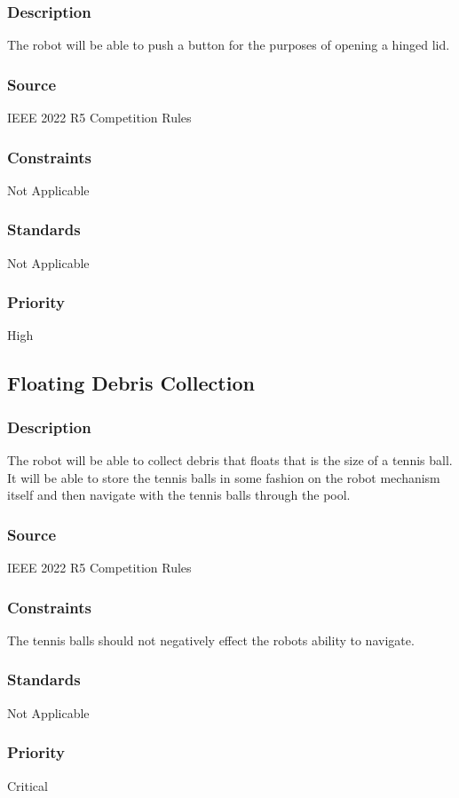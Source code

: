 \subsubsection{Description}
The robot will be able to push a button for the purposes of opening a hinged lid.
\subsubsection{Source}
IEEE 2022 R5 Competition Rules
\subsubsection{Constraints}
Not Applicable
\subsubsection{Standards}
Not Applicable
\subsubsection{Priority}
High

\subsection{Floating Debris Collection}
\subsubsection{Description}
The robot will be able to collect debris that floats that is the size of a tennis ball. It will be able to store the tennis balls in some fashion on the robot mechanism itself and then navigate with the tennis balls through the pool.
\subsubsection{Source}
IEEE 2022 R5 Competition Rules
\subsubsection{Constraints}
The tennis balls should not negatively effect the robots ability to navigate.
\subsubsection{Standards}
Not Applicable
\subsubsection{Priority}
Critical

